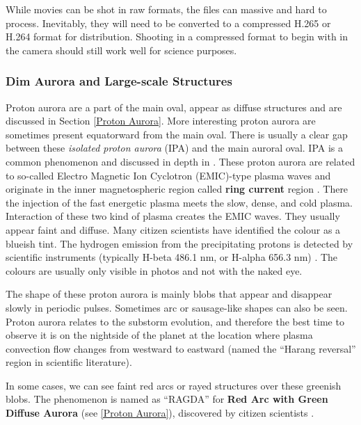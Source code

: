 \documentclass{article}
\renewcommand{\cite}[1]{\parencite{#1}}
\begin{document}
While movies can be shot in raw formats, the files can massive and hard to process. Inevitably, they will need to be converted to a compressed H.265 or H.264 format for distribution. Shooting in a compressed format to begin with in the camera should still work well for science purposes.

\subsubsection{Dim Aurora and Large-scale Structures}\label{DimAurora}


Proton aurora are a part of the main oval, appear as diffuse structures and are discussed in Section \ref{Proton Aurora}. More interesting proton aurora are sometimes present equatorward from the main oval. There is usually a clear gap between these \textit{isolated proton aurora} (IPA) and the main auroral oval. IPA is a common phenomenon and discussed in depth in \cite{Liang2022}. These proton aurora are related to so-called Electro Magnetic Ion Cyclotron (EMIC)-type plasma waves and originate in the inner magnetospheric region called {\bf ring current} region \cite{Liang2022}. There the injection of the fast energetic plasma meets the slow, dense, and cold plasma. Interaction of these two kind of plasma creates the EMIC waves. They usually appear faint and diffuse. Many citizen scientists have identified the colour as a blueish tint. The hydrogen emission from the precipitating protons is detected by scientific instruments (typically H-beta 486.1 nm, or H-alpha 656.3 nm) \cite{Liang2022}. The colours are usually only visible in photos and not with the naked eye. 

The shape of these proton aurora is mainly blobs that appear and disappear slowly in periodic pulses. Sometimes arc or sausage-like shapes can also be seen. Proton aurora relates to the substorm evolution, and therefore the best time to observe it is on the nightside of the planet at the location where plasma convection flow changes from westward to eastward (named the ``Harang reversal'' region in scientific literature).

In some cases, we can see faint red arcs or rayed structures over these greenish blobs. The phenomenon is named as ``RAGDA'' for {\bf Red Arc with Green Diffuse Aurora} (see \ref{Proton Aurora}), discovered by citizen scientists \cite{Nishimura2022}. 
\end{document}
